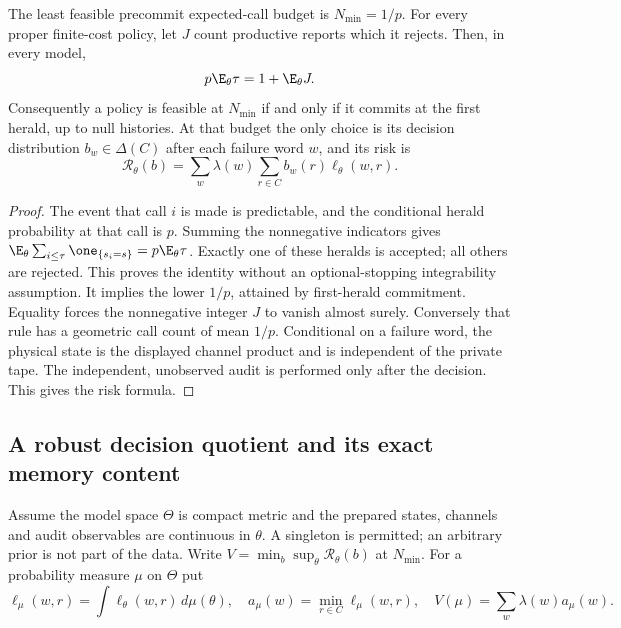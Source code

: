 \begin{lemma}\label{lem:boundary-herald}
The least feasible precommit expected-call budget is $N_{\min}=1/p$. For every proper finite-cost policy, let $J$ count productive reports which it rejects. Then, in every model,
\begin{equation}\label{eq:herald-cost-identity}
 p\E_\theta\tau=1+\E_\theta J.
\end{equation}
Consequently a policy is feasible at $N_{\min}$ if and only if it commits at the first herald, up to null histories. At that budget the only choice is its decision distribution $b_w\in\Delta(C)$ after each failure word $w$, and its risk is
\begin{equation}\label{eq:boundary-risk-functional}
 \mathcal R_\theta(b)=\sum_w\lambda(w)\sum_{r\in C}b_w(r)\ell_\theta(w,r).
\end{equation}
\end{lemma}
\begin{proof}
The event that call $i$ is made is predictable, and the conditional herald probability at that call is $p$. Summing the nonnegative indicators gives $\E_\theta\sum_{i\le\tau}\one_{\{s_i=s\}}=p\E_\theta\tau$. Exactly one of these heralds is accepted; all others are rejected. This proves the identity without an optional-stopping integrability assumption. It implies the lower $1/p$, attained by first-herald commitment. Equality forces the nonnegative integer $J$ to vanish almost surely. Conversely that rule has a geometric call count of mean $1/p$. Conditional on a failure word, the physical state is the displayed channel product and is independent of the private tape. The independent, unobserved audit is performed only after the decision. This gives the risk formula.
\end{proof}

\subsection{A robust decision quotient and its exact memory content}
Assume the model space $\Theta$ is compact metric and the prepared states, channels and audit observables are continuous in $\theta$. A singleton is permitted; an arbitrary prior is not part of the data. Write $V=\min_b\sup_\theta\mathcal R_\theta(b)$ at $N_{\min}$. For a probability measure $\mu$ on $\Theta$ put
\[
 \ell_\mu(w,r)=\int\ell_\theta(w,r)\,d\mu(\theta),\quad
 a_\mu(w)=\min_{r\in C}\ell_\mu(w,r),\quad
 V(\mu)=\sum_w\lambda(w)a_\mu(w).
\]

